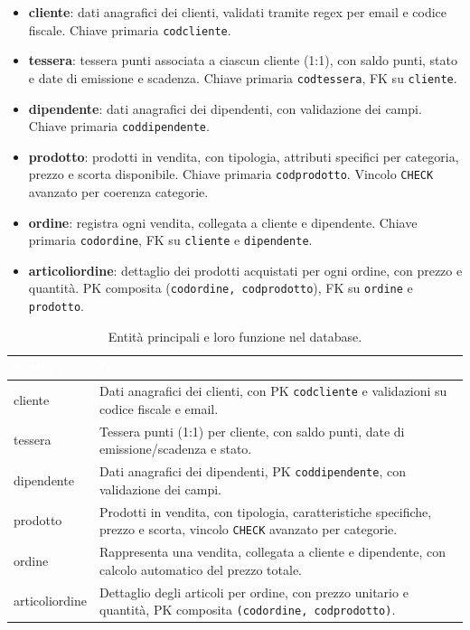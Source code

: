 \documentclass[a4paper,12pt]{article}
\renewcommand{\arraystretch}{1.2} %
\begin{document}
\begin{itemize}
    \item \textbf{cliente}: dati anagrafici dei clienti, validati tramite regex per email e codice fiscale. Chiave primaria \texttt{codcliente}.  
    \item \textbf{tessera}: tessera punti associata a ciascun cliente (1:1), con saldo punti, stato e date di emissione e scadenza. Chiave primaria \texttt{codtessera}, FK su \texttt{cliente}.  
    \item \textbf{dipendente}: dati anagrafici dei dipendenti, con validazione dei campi. Chiave primaria \texttt{coddipendente}.  
    \item \textbf{prodotto}: prodotti in vendita, con tipologia, attributi specifici per categoria, prezzo e scorta disponibile. Chiave primaria \texttt{codprodotto}. Vincolo \texttt{CHECK} avanzato per coerenza categorie.  
    \item \textbf{ordine}: registra ogni vendita, collegata a cliente e dipendente. Chiave primaria \texttt{codordine}, FK su \texttt{cliente} e \texttt{dipendente}.  
    \item \textbf{articoliordine}: dettaglio dei prodotti acquistati per ogni ordine, con prezzo e quantità. PK composita (\texttt{codordine, codprodotto}), FK su \texttt{ordine} e \texttt{prodotto}.
\end{itemize}

\vspace{0.5em}
\renewcommand{\arraystretch}{1.3}
\begin{table}[htbp]
\centering
\setlength{\tabcolsep}{8pt}
\begin{tabular}{|>{\centering\arraybackslash}m{3.5cm}|>{\raggedright\arraybackslash}m{9.5cm}|}
\hline
\rowcolor{myblue}\textcolor{white}{\textbf{Entità}} & \textcolor{white}{\textbf{Descrizione}} \\
\hline
\rowcolor{mygray} cliente & Dati anagrafici dei clienti, con PK \texttt{codcliente} e validazioni su codice fiscale e email. \\
tessera & Tessera punti (1:1) per cliente, con saldo punti, date di emissione/scadenza e stato. \\
\rowcolor{mygray} dipendente & Dati anagrafici dei dipendenti, PK \texttt{coddipendente}, con validazione dei campi. \\
prodotto & Prodotti in vendita, con tipologia, caratteristiche specifiche, prezzo e scorta, vincolo \texttt{CHECK} avanzato per categorie. \\
\rowcolor{mygray} ordine & Rappresenta una vendita, collegata a cliente e dipendente, con calcolo automatico del prezzo totale. \\
articoliordine & Dettaglio degli articoli per ordine, con prezzo unitario e quantità, PK composita \texttt{(codordine, codprodotto)}. \\
\hline
\end{tabular}
\caption{Entità principali e loro funzione nel database.}
\end{table}
\end{document}
